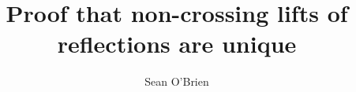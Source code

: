 \documentclass{amsart}
\begin{document}
\title{Proof that non-crossing lifts of reflections are unique}


\author{Sean O'Brien}
\address{}
\curraddr{}


%
%
%

% 

\maketitle






\end{document}
